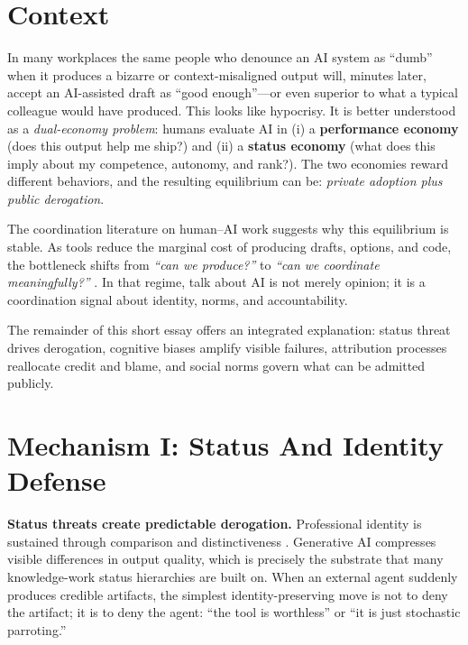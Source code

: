 \documentclass[11pt, a4paper, twocolumn]{article} %
\begin{document}
\clearpage
\color{Black}

\section*{Context}

In many workplaces the same people who denounce an AI system as ``dumb'' when it produces a bizarre or context-misaligned output will, minutes later, accept an AI-assisted draft as ``good enough''---or even superior to what a typical colleague would have produced. This looks like hypocrisy. It is better understood as a \emph{dual-economy problem}: humans evaluate AI in (i) a \textbf{performance economy} (does this output help me ship?) and (ii) a \textbf{status economy} (what does this imply about my competence, autonomy, and rank?). The two economies reward different behaviors, and the resulting equilibrium can be: \emph{private adoption plus public derogation}.

The coordination literature on human--AI work suggests why this equilibrium is stable. As tools reduce the marginal cost of producing drafts, options, and code, the bottleneck shifts from \textit{``can we produce?''} to \textit{``can we coordinate meaningfully?''} \citep{Blomgren2025CoordinationShift,Hutchins2001DistributedCognition}. In that regime, talk about AI is not merely opinion; it is a coordination signal about identity, norms, and accountability.

The remainder of this short essay offers an integrated explanation: status threat drives derogation, cognitive biases amplify visible failures, attribution processes reallocate credit and blame, and social norms govern what can be admitted publicly.

\section*{Mechanism I: Status And Identity Defense}

\textbf{Status threats create predictable derogation.} Professional identity is sustained through comparison and distinctiveness \citep{Festinger1954SocialComparison,AshforthMael1989SocialIdentity}. Generative AI compresses visible differences in output quality, which is precisely the substrate that many knowledge-work status hierarchies are built on. When an external agent suddenly produces credible artifacts, the simplest identity-preserving move is not to deny the artifact; it is to deny the agent: ``the tool is worthless'' or ``it is just stochastic parroting.''
\end{document}
